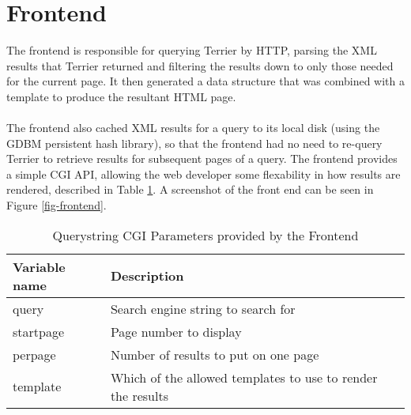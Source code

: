 \section{Frontend}
The frontend is responsible for querying Terrier by HTTP, parsing the XML results that Terrier returned and filtering the results down to only those needed for the current page. It then generated a data structure that was combined with a template to produce the resultant HTML page.\\
\ \\
The frontend also cached XML results for a query to its local disk (using the GDBM persistent hash library), so that the frontend had no need to re-query Terrier to retrieve results for subsequent pages of a query. The frontend provides a simple CGI API, allowing the web developer some flexability in how results are rendered, described in Table \ref{tbl-frontendparam}. A screenshot of the front end can be seen in Figure \ref{fig-frontend}.
\begin{table}
\begin{center}
\begin{tabular}{|l|l|}
\hline
\bf{Variable name} & \bf{Description} \\
\hline
query & Search engine string to search for \\
\hline
startpage & Page number to display \\
\hline
perpage & Number of results to put on one page \\
\hline
template & Which of the allowed templates to use to render the results \\
\hline
\end{tabular}
\caption{Querystring CGI Parameters provided by the Frontend}\label{tbl-frontendparam}
\end{center}
\end{table}
